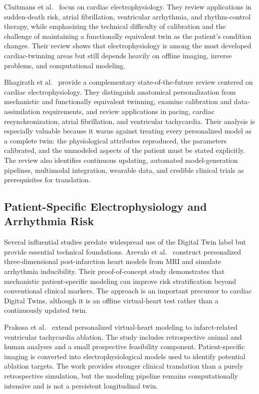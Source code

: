 Cluitmans et al.~\cite{cluitmans2024electrophysiology} focus on cardiac electrophysiology. They review applications in sudden-death risk, atrial fibrillation, ventricular arrhythmia, and rhythm-control therapy, while emphasizing the technical difficulty of calibration and the challenge of maintaining a functionally equivalent twin as the patient's condition changes. Their review shows that electrophysiology is among the most developed cardiac-twinning areas but still depends heavily on offline imaging, inverse problems, and computational modeling.

Bhagirath et al.~\cite{bhagirath2024bits} provide a complementary state-of-the-future review centered on cardiac electrophysiology. They distinguish anatomical personalization from mechanistic and functionally equivalent twinning, examine calibration and data-assimilation requirements, and review applications in pacing, cardiac resynchronization, atrial fibrillation, and ventricular tachycardia. Their analysis is especially valuable because it warns against treating every personalized model as a complete twin: the physiological attributes reproduced, the parameters calibrated, and the unmodeled aspects of the patient must be stated explicitly. The review also identifies continuous updating, automated model-generation pipelines, multimodal integration, wearable data, and credible clinical trials as prerequisites for translation.

\subsection{Patient-Specific Electrophysiology and Arrhythmia Risk}
Several influential studies predate widespread use of the Digital Twin label but provide essential technical foundations. Arevalo et al.~\cite{arevalo2016arrhythmia} construct personalized three-dimensional post-infarction heart models from MRI and simulate arrhythmia inducibility. Their proof-of-concept study demonstrates that mechanistic patient-specific modeling can improve risk stratification beyond conventional clinical markers. The approach is an important precursor to cardiac Digital Twins, although it is an offline virtual-heart test rather than a continuously updated twin.

Prakosa et al.~\cite{prakosa2018virtualheart} extend personalized virtual-heart modeling to infarct-related ventricular tachycardia ablation. The study includes retrospective animal and human analyses and a small prospective feasibility component. Patient-specific imaging is converted into electrophysiological models used to identify potential ablation targets. The work provides stronger clinical translation than a purely retrospective simulation, but the modeling pipeline remains computationally intensive and is not a persistent longitudinal twin.

